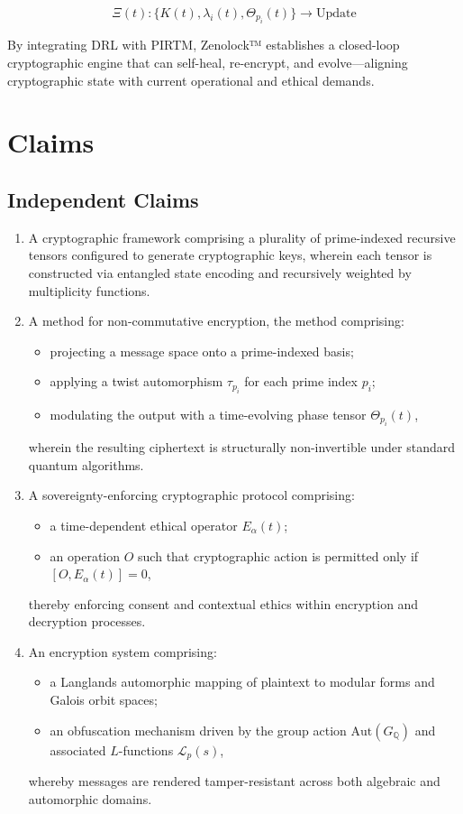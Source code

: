 \documentclass{article}
\theoremstyle{plain}
\begin{document}
\[
\Xi(t): \{K(t), \lambda_i(t), \Theta_{p_i}(t)\} \rightarrow \text{Update}
\]

By integrating DRL with PIRTM, Zenolock™ establishes a closed-loop cryptographic engine that can self-heal, re-encrypt, and evolve—aligning cryptographic state with current operational and ethical demands.


\section{Claims}

\subsection{Independent Claims}

\begin{enumerate}
  \item A cryptographic framework comprising a plurality of prime-indexed recursive tensors configured to generate cryptographic keys, wherein each tensor is constructed via entangled state encoding and recursively weighted by multiplicity functions.

  \item A method for non-commutative encryption, the method comprising:
  \begin{itemize}
    \item projecting a message space onto a prime-indexed basis;
    \item applying a twist automorphism $\tau_{p_i}$ for each prime index $p_i$;
    \item modulating the output with a time-evolving phase tensor $\Theta_{p_i}(t)$,
  \end{itemize}
  wherein the resulting ciphertext is structurally non-invertible under standard quantum algorithms.

  \item A sovereignty-enforcing cryptographic protocol comprising:
  \begin{itemize}
    \item a time-dependent ethical operator $E_\alpha(t)$;
    \item an operation $O$ such that cryptographic action is permitted only if $[O, E_\alpha(t)] = 0$,
  \end{itemize}
  thereby enforcing consent and contextual ethics within encryption and decryption processes.

  \item An encryption system comprising:
  \begin{itemize}
    \item a Langlands automorphic mapping of plaintext to modular forms and Galois orbit spaces;
    \item an obfuscation mechanism driven by the group action $\text{Aut}(G_{\mathbb{Q}})$ and associated $L$-functions $\mathcal{L}_p(s)$,
  \end{itemize}
  whereby messages are rendered tamper-resistant across both algebraic and automorphic domains.


\end{enumerate}
\end{document}
